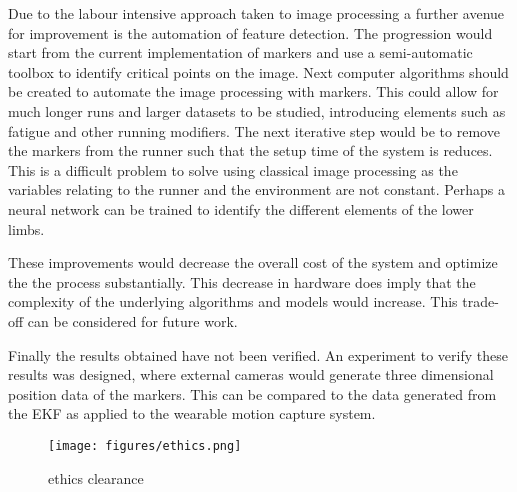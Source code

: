 Due to the labour intensive approach taken to image processing a further avenue for improvement is the automation of feature detection. The progression would start from the current implementation of markers and use a semi-automatic toolbox to identify critical points on the image. Next computer algorithms should be created to automate the image processing with markers. This could allow for much longer runs and larger datasets to be studied, introducing elements such as fatigue and other running modifiers. The next iterative step would be to remove the markers from the runner such that the setup time of the system is reduces. This is a difficult problem to solve using classical image processing as the variables relating to the runner and the environment are not constant. Perhaps a neural network can be trained to identify the different elements of the lower limbs.

These improvements would decrease the overall cost of the system and optimize the the process substantially. This decrease in hardware does imply that the complexity of the underlying algorithms and models would increase. This trade-off can be considered for future work.

Finally the results obtained have not been verified. An experiment to verify these results was designed, where external cameras would generate three dimensional position data of the markers. This can be compared to the data generated from the EKF as applied to the wearable motion capture system.

\newpage
\begin{figure}[!ht] 
\captionsetup{width=1\linewidth, font=small}  
\texttt{[image: figures/ethics.png]}
\caption{ethics clearance}
\label{fig:ethics}
\end{figure}









